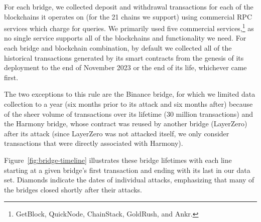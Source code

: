 For each bridge, we collected deposit and withdrawal transactions for
each of the blockchains it operates on (for the 21 chains we
support) using commercial RPC services which charge for queries.  We
primarily used five commercial services,\footnote{%
GetBlock, QuickNode, ChainStack, GoldRush, and Ankr.} 
as no single service supports
all of the blockchains and functionality we need.
For each bridge and blockchain combination, by default we
collected all of the historical transactions generated by its smart
contracts from the genesis of its deployment to the end of November
2023 or the end of its life, whichever came first.

The two exceptions to this rule are the Binance bridge, for which we
limited data collection to a year (six months prior to its attack and
six months after) because of the sheer volume of transactions over its
lifetime (30 million transactions) and the Harmony bridge, whose
contract was reused by another bridge (LayerZero) after its attack
(since LayerZero was not attacked itself, we only consider transactions that were directly associated with Harmony).


%
%

Figure~\ref{fig:bridge-timeline} illustrates these bridge lifetimes
with each line starting at a given bridge's first transaction and
ending with its last in our data set.  Diamonds indicate the dates of
individual attacks, emphasizing that many of the bridges closed
shortly after their attacks.
